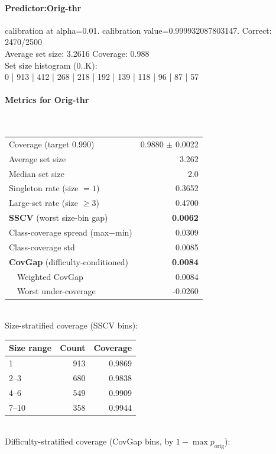 \documentclass[parskip=half]{scrartcl}
\begin{document}
\paragraph{Predictor:Orig-thr} calibration at alpha=0.01. calibration value=0.999932087803147. Correct: 2470/2500\\
Average set size: 3.2616   Coverage: 0.988\\
Set size histogram (0..K):\\
0 | 913 | 412 | 268 | 218 | 192 | 139 | 118 | 96 | 87 | 57\\
\paragraph{Metrics for Orig-thr}~\\
\begin{tabular}{l r}
\hline
Coverage (target 0.990) & 0.9880 $\pm$ 0.0022 \\
Average set size & 3.262 \\
Median set size & 2.0 \\
Singleton rate (size $=1$) & 0.3652 \\
Large-set rate (size $\geq 3$) & 0.4700 \\
\textbf{SSCV} (worst size-bin gap) & \textbf{0.0062} \\
Class-coverage spread (max$-$min) & 0.0309 \\
Class-coverage std & 0.0085 \\
\textbf{CovGap} (difficulty-conditioned) & \textbf{0.0084} \\
~~Weighted CovGap & 0.0084 \\
~~Worst under-coverage & -0.0260 \\
\hline
\end{tabular}\\[0.5em]
\textsf{\scriptsize Size-stratified coverage (SSCV bins):}\\
\begin{tabular}{l r r}
\hline
Size range & Count & Coverage \\
\hline
1 & 913 & 0.9869 \\
2--3 & 680 & 0.9838 \\
4--6 & 549 & 0.9909 \\
7--10 & 358 & 0.9944 \\
\hline
\end{tabular}\\[0.5em]
\textsf{\scriptsize Difficulty-stratified coverage (CovGap bins, by $1-\max p_{\mathrm{orig}}$):}\\
\end{document}

